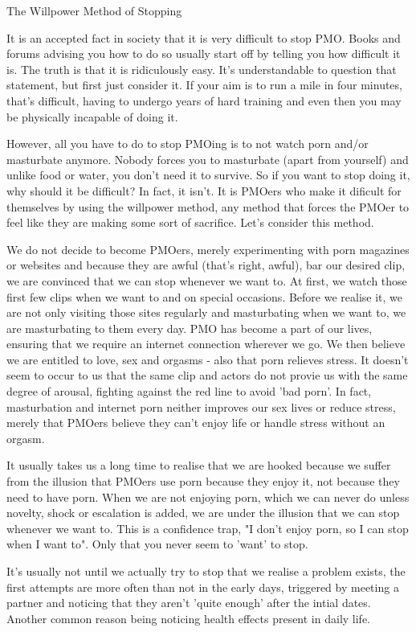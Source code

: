 The Willpower Method of Stopping

It is an accepted fact in society that it is very difficult to stop PMO. Books and forums advising you how to do so usually start off by telling you how difficult it is. The truth is that it is ridiculously easy. It's understandable to question that statement, but first just consider it. If your aim is to run a mile in four minutes, that's difficult, having to undergo years of hard training and even then you may be physically incapable of doing it.

However, all you have to do to stop PMOing is to not watch porn and/or masturbate anymore. Nobody forces you to masturbate (apart from yourself) and unlike food or water, you don't need it to survive. So if you want to stop doing it, why should it be difficult? In fact, it isn't. It is PMOers who make it dificult for themselves by using the willpower method, any method that forces the PMOer to feel like they are making some sort of sacrifice. Let's consider this method.

We do not decide to become PMOers, merely experimenting with porn magazines or websites and because they are awful (that's right, awful), bar our desired clip, we are convinced that we can stop whenever we want to. At first, we watch those first few clips when we want to and on special occasions. Before we realise it, we are not only visiting those sites regularly and masturbating when we want to, we are masturbating to them every day. PMO has become a part of our lives, ensuring that we require an internet connection wherever we go. We then believe we are entitled to love, sex and orgasms - also that porn relieves stress. It doesn't seem to occur to us that the same clip and actors do not provie us with the same degree of arousal, fighting against the red line to avoid 'bad porn'. In fact, masturbation and internet porn neither improves our sex lives or reduce stress, merely that PMOers believe they can't enjoy life or handle stress without an orgasm.

It usually takes us a long time to realise that we are hooked because we suffer from the illusion that PMOers use porn because they enjoy it, not because they need to have porn. When we are not enjoying porn, which we can never do unless novelty, shock or escalation is added, we are under the illusion that we can stop whenever we want to. This is a confidence trap, "I don't enjoy porn, so I can stop when I want to". Only that you never seem to 'want' to stop.

It's usually not until we actually try to stop that we realise a problem exists, the first attempts are more often than not in the early days, triggered by meeting a partner and noticing that they aren't 'quite enough' after the intial dates. Another common reason being noticing health effects present in daily life.


